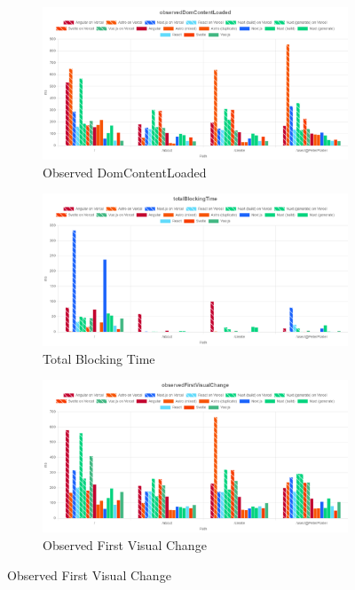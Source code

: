 \documentclass[a4paper, 10pt]{article}
\begin{document}
\begin{figure}[ht!]\ContinuedFloat
  \centering  
  \begin{subfigure}{0.95\linewidth}
    \begin{center}
      \includegraphics[width=\linewidth, keepaspectratio]{img/lighthouse-results/observedDomContentLoaded.png}
    \end{center}
    \caption{Observed DomContentLoaded}\label{subfig:LH:observedDomContentLoaded}
  \end{subfigure}
  \begin{subfigure}{0.95\linewidth}
    \begin{center}
      \includegraphics[width=\linewidth, keepaspectratio]{img/lighthouse-results/TBT.png}
    \end{center}
    \caption{Total Blocking Time}\label{subfig:LH:totalBlockingTime}
  \end{subfigure}
  \begin{subfigure}{0.95\linewidth}
    \begin{center}
      \includegraphics[width=\linewidth, keepaspectratio]{img/lighthouse-results/OFVC.png}
    \end{center}
    \caption{Observed First Visual Change}\label{subfig:LH:observedFirstVisualChange}
  \end{subfigure}
  

\end{figure}
\end{document}
